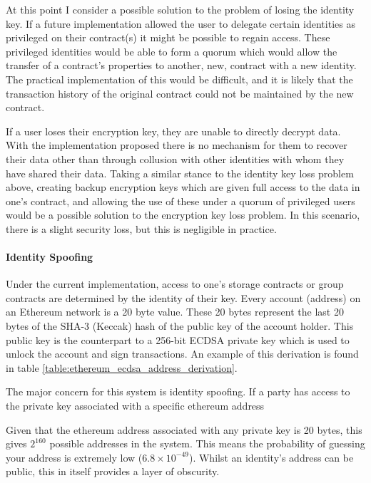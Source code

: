 At this point I consider a possible solution to the problem of losing the identity key. If a future implementation allowed the user to delegate certain identities as privileged on their contract(s) it might be possible to regain access. These privileged identities would be able to form a quorum which would allow the transfer of a contract's properties to another, new, contract with a new identity. The practical implementation of this would be difficult, and it is likely that the transaction history of the original contract could not be maintained by the new contract.

If a user loses their encryption key, they are unable to directly decrypt data. With the implementation proposed there is no mechanism for them to recover their data other than through collusion with other identities with whom they have shared their data. Taking a similar stance to the identity key loss problem above, creating backup encryption keys which are given full access to the data in one's contract, and allowing the use of these under a quorum of privileged users would be a possible solution to the encryption key loss problem. In this scenario, there is a slight security loss, but this is negligible in practice.

\paragraph{Identity Spoofing}

Under the current implementation, access to one's storage contracts or group contracts are determined by the identity of their key. Every account (address) on an Ethereum network is a 20 byte value. These 20 bytes represent the last 20 bytes of the SHA-3 (Keccak) hash of the public key of the account holder. This public key is the counterpart to a 256-bit ECDSA private key which is used to unlock the account and sign transactions. An example of this derivation is found in table \ref{table:ethereum_ecdsa_address_derivation}.



The major concern for this system is identity spoofing. If a party has access to the private key associated with a specific ethereum address

Given that the ethereum address associated with any private key is 20 bytes, this gives $2^{160}$ possible addresses in the system. This means the probability of
guessing your address is extremely low ($6.8 \times 10^{-49}$). Whilst an identity's address can be public, this in itself provides a layer of obscurity.

